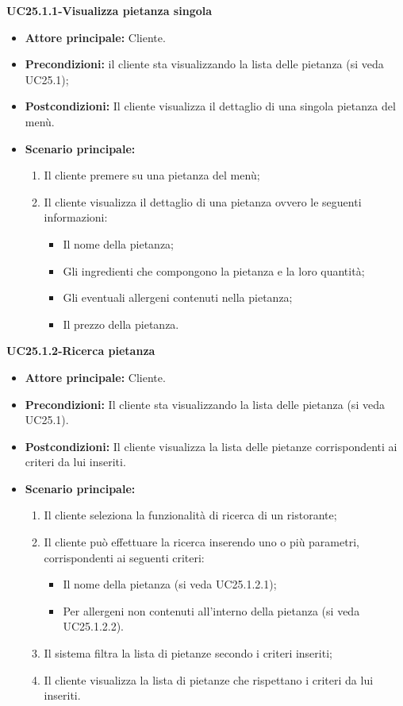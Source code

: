 \textbf{UC25.1.1-Visualizza pietanza singola}
\begin{itemize}
\item \textbf{Attore principale:} Cliente.
\item \textbf{Precondizioni:} il cliente sta visualizzando la lista delle pietanza (si veda UC25.1);
\item \textbf{Postcondizioni:} Il cliente visualizza il dettaglio di una singola pietanza del menù.
\item \textbf{Scenario principale:}
\begin{enumerate}
    \item Il cliente premere su una pietanza del menù;
    \item Il cliente visualizza il dettaglio di una pietanza ovvero le seguenti informazioni:
    \begin{itemize}
        \item Il nome della pietanza;
        \item Gli ingredienti che compongono la pietanza e la loro quantità;
        \item Gli eventuali allergeni contenuti nella pietanza;
        \item Il prezzo della pietanza.
    \end{itemize}
\end{enumerate}
\end{itemize}

\textbf{UC25.1.2-Ricerca pietanza}
\begin{itemize}
\item \textbf{Attore principale:} Cliente.
\item \textbf{Precondizioni:}  Il cliente sta visualizzando la lista delle pietanza (si veda UC25.1).
\item \textbf{Postcondizioni:} Il cliente visualizza la lista delle pietanze corrispondenti ai criteri da lui inseriti.
\item \textbf{Scenario principale:}
\begin{enumerate}
    \item Il cliente seleziona la funzionalità di ricerca di un ristorante;
    \item Il cliente può effettuare la ricerca inserendo uno o più parametri, corrispondenti ai seguenti criteri:
    \begin{itemize}
        \item Il nome della pietanza (si veda UC25.1.2.1);
        \item Per allergeni non contenuti all'interno della pietanza (si veda UC25.1.2.2).
    \end{itemize}
    \item Il sistema filtra la lista di pietanze secondo i criteri inseriti;
    \item Il cliente visualizza la lista di pietanze che rispettano i criteri da lui inseriti.
\end{enumerate}
\end{itemize}

